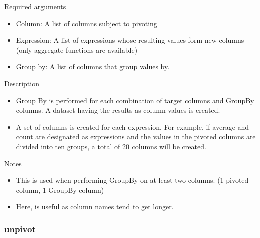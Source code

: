 \documentclass[letterpaper,10pt,english]{sphinxmanual}
\begin{document}
Required arguments
\begin{itemize}
\item {} 
Column: A list of columns subject to pivoting

\item {} 
Expression: A list of expressions whose resulting values form new columns (only aggregate functions are available)

\item {} 
Group by: A list of columns that group values by.

\end{itemize}

Description
\begin{itemize}
\item {} 
Group By is performed for each combination of target columns and GroupBy columns. A dataset having the results as column values is created.

\item {} 
A set of columns is created for each expression. For example, if average and count are designated as expressions and the values in the pivoted columns are divided into ten groups, a total of 20 columns will be created.

\end{itemize}

Notes
\begin{itemize}
\item {} 
This is used when performing GroupBy on at least two columns. (1 pivoted column, 1 GroupBy column)

\item {} 
Here,  is useful as column names tend to get longer.
\begin{quote}

\begin{figure}[H]
\centering

\noindent{}
\end{figure}
\end{quote}

\end{itemize}


\subsubsection{unpivot}
\label{\detokenize{discovery/part07/rule_kinds:unpivot}}
\begin{figure}[H]
\centering

\noindent{}
\end{figure}
\end{document}
